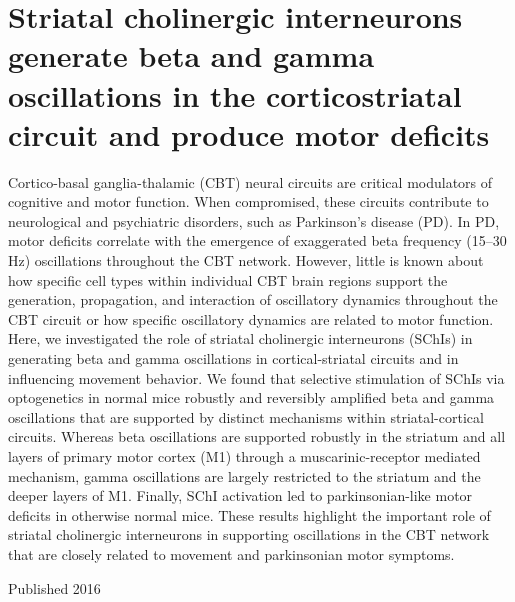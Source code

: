 \section*{Striatal cholinergic interneurons generate beta and gamma oscillations in the corticostriatal circuit and produce motor deficits}
\label{sec:kk}

Cortico-basal ganglia-thalamic (CBT) neural circuits are critical modulators of cognitive and motor function.
When compromised, these circuits contribute to neurological and psychiatric disorders, such as Parkinson’s disease (PD).
In PD, motor deficits correlate with the emergence of exaggerated beta frequency (15–30 Hz) oscillations throughout the CBT network.
However, little is known about how specific cell types within individual CBT brain regions support the generation, propagation, and interaction of oscillatory dynamics throughout the CBT circuit or how specific oscillatory dynamics are related to motor function.
Here, we investigated the role of striatal cholinergic interneurons (SChIs) in generating beta and gamma oscillations in cortical-striatal circuits and in influencing movement behavior.
We found that selective stimulation of SChIs via optogenetics in normal mice robustly and reversibly amplified beta and gamma oscillations that are supported by distinct mechanisms within striatal-cortical circuits.
Whereas beta oscillations are supported robustly in the striatum and all layers of primary motor cortex (M1) through a muscarinic-receptor mediated mechanism, gamma oscillations are largely restricted to the striatum and the deeper layers of M1.
Finally, SChI activation led to parkinsonian-like motor deficits in otherwise normal mice.
These results highlight the important role of striatal cholinergic interneurons in supporting oscillations in the CBT network that are closely related to movement and parkinsonian motor symptoms.

\noindent
Published 2016 \cite{Kondabolu_2016}

\clearpage

